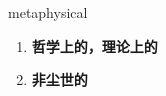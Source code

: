 
\begin{frame}
{\huge metaphysical}
\begin{center}
\begin{enumerate}\Large
  \item \textbf{哲学上的，理论上的}
  \item \textbf{非尘世的}
\end{enumerate}
\end{center}
\end{frame}
